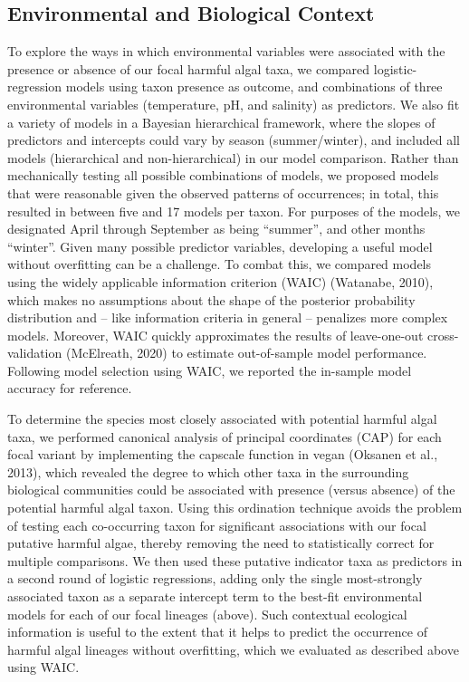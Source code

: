 \documentclass[
]{article}
\begin{document}
\hypertarget{environmental-and-biological-context}{%
\subsection{Environmental and Biological
Context}\label{environmental-and-biological-context}}

To explore the ways in which environmental variables were associated
with the presence or absence of our focal harmful algal taxa, we
compared logistic-regression models using taxon presence as outcome, and
combinations of three environmental variables (temperature, pH, and
salinity) as predictors. We also fit a variety of models in a Bayesian
hierarchical framework, where the slopes of predictors and intercepts
could vary by season (summer/winter), and included all models
(hierarchical and non-hierarchical) in our model comparison. Rather than
mechanically testing all possible combinations of models, we proposed
models that were reasonable given the observed patterns of occurrences;
in total, this resulted in between five and 17 models per taxon. For
purposes of the models, we designated April through September as being
``summer'', and other months ``winter''. Given many possible predictor
variables, developing a useful model without overfitting can be a
challenge. To combat this, we compared models using the widely
applicable information criterion (WAIC) (Watanabe, 2010), which makes no
assumptions about the shape of the posterior probability distribution
and -- like information criteria in general -- penalizes more complex
models. Moreover, WAIC quickly approximates the results of leave-one-out
cross-validation (McElreath, 2020) to estimate out-of-sample model
performance. Following model selection using WAIC, we reported the
in-sample model accuracy for reference.

To determine the species most closely associated with potential harmful
algal taxa, we performed canonical analysis of principal coordinates
(CAP) for each focal variant by implementing the capscale function in
vegan (Oksanen et al., 2013), which revealed the degree to which other
taxa in the surrounding biological communities could be associated with
presence (versus absence) of the potential harmful algal taxon. Using
this ordination technique avoids the problem of testing each
co-occurring taxon for significant associations with our focal putative
harmful algae, thereby removing the need to statistically correct for
multiple comparisons. We then used these putative indicator taxa as
predictors in a second round of logistic regressions, adding only the
single most-strongly associated taxon as a separate intercept term to
the best-fit environmental models for each of our focal lineages
(above). Such contextual ecological information is useful to the extent
that it helps to predict the occurrence of harmful algal lineages
without overfitting, which we evaluated as described above using WAIC.
\end{document}
